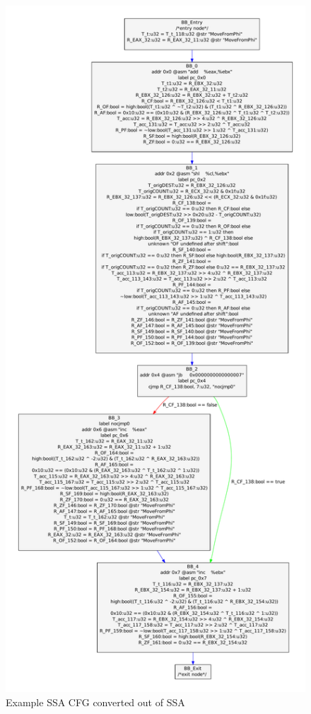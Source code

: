 \begin{figure}[!p]
  \begin{center}
    \includegraphics[height=.9\textheight]{chap-examples/ssaconvcfg.pdf}
  \end{center}
  \caption{Example SSA CFG converted out of SSA}
  \label{fig:ssaconvcfg}
\end{figure}

